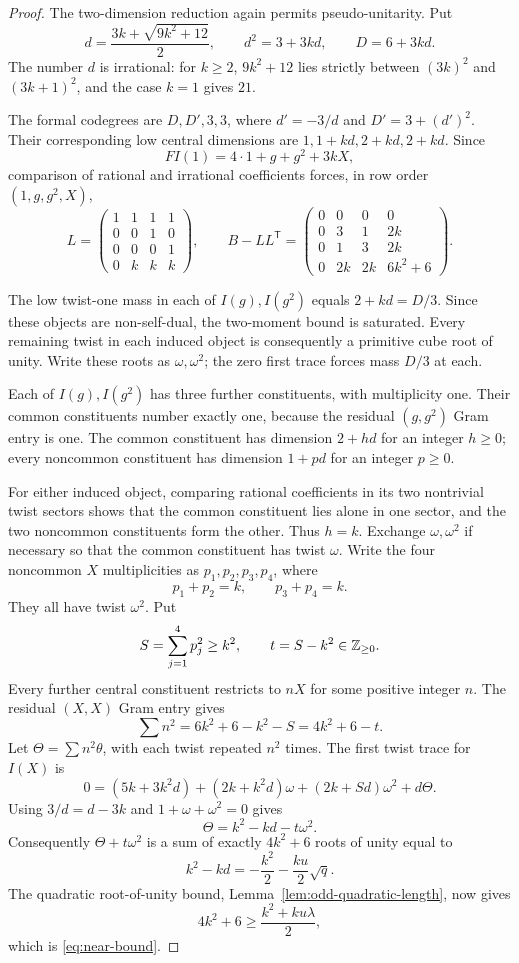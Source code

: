 \begin{proof}
The two-dimension reduction again permits pseudo-unitarity. Put
\[
d=\frac{3k+\sqrt{9k^2+12}}2,\qquad d^2=3+3kd,\qquad D=6+3kd.
\]
The number $d$ is irrational: for $k\geq2$, $9k^2+12$ lies strictly between $(3k)^2$ and $(3k+1)^2$, and the case $k=1$ gives $21$.

The formal codegrees are $D,D',3,3$, where $d'=-3/d$ and $D'=3+(d')^2$. Their corresponding low central dimensions are $1,1+kd,2+kd,2+kd$. Since
\[
FI(1)=4\cdot1+g+g^2+3kX,
\]
comparison of rational and irrational coefficients forces, in row order $(1,g,g^2,X)$,
\[
L=\begin{pmatrix}1&1&1&1\\0&0&1&0\\0&0&0&1\\0&k&k&k\end{pmatrix},\qquad
B-LL^{\mathsf T}=\begin{pmatrix}
0&0&0&0\\0&3&1&2k\\0&1&3&2k\\0&2k&2k&6k^2+6
\end{pmatrix}.
\]

The low twist-one mass in each of $I(g),I(g^2)$ equals $2+kd=D/3$. Since these objects are non-self-dual, the two-moment bound is saturated. Every remaining twist in each induced object is consequently a primitive cube root of unity. Write these roots as $\omega,\omega^2$; the zero first trace forces mass $D/3$ at each.

Each of $I(g),I(g^2)$ has three further constituents, with multiplicity one. Their common constituents number exactly one, because the residual $(g,g^2)$ Gram entry is one. The common constituent has dimension $2+hd$ for an integer $h\geq0$; every noncommon constituent has dimension $1+pd$ for an integer $p\geq0$.

For either induced object, comparing rational coefficients in its two nontrivial twist sectors shows that the common constituent lies alone in one sector, and the two noncommon constituents form the other. Thus $h=k$. Exchange $\omega,\omega^2$ if necessary so that the common constituent has twist $\omega$. Write the four noncommon $X$ multiplicities as $p_1,p_2,p_3,p_4$, where
\[
p_1+p_2=k,\qquad p_3+p_4=k.
\]
They all have twist $\omega^2$. Put
\[
S=\sum_{j=1}^4p_j^2\geq k^2,\qquad t=S-k^2\in\mathbb Z_{\geq0}.
\]
Every further central constituent restricts to $nX$ for some positive integer $n$. The residual $(X,X)$ Gram entry gives
\[
\sum n^2=6k^2+6-k^2-S=4k^2+6-t.
\]
Let $\Theta=\sum n^2\theta$, with each twist repeated $n^2$ times. The first twist trace for $I(X)$ is
\[
0=(5k+3k^2d)+(2k+k^2d)\omega+(2k+Sd)\omega^2+d\Theta.
\]
Using $3/d=d-3k$ and $1+\omega+\omega^2=0$ gives
\[
\Theta=k^2-kd-t\omega^2.
\]
Consequently $\Theta+t\omega^2$ is a sum of exactly $4k^2+6$ roots of unity equal to
\[
k^2-kd=-\frac{k^2}{2}-\frac{ku}{2}\sqrt q.
\]
The quadratic root-of-unity bound, Lemma~\ref{lem:odd-quadratic-length}, now gives
\[
4k^2+6\geq\frac{k^2+ku\lambda}{2},
\]
which is \eqref{eq:near-bound}.
\end{proof}
